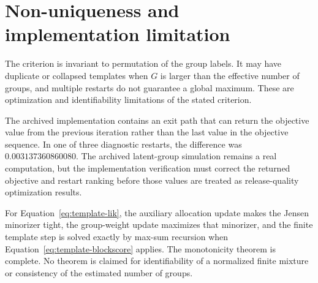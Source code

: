\begin{algorithm}[H]
\caption{Alternating optimization for finite latent-group templates}
\label{alg:multi-em}
\end{algorithm}

\section{Non-uniqueness and implementation limitation}
The criterion is invariant to permutation of the group labels. It may have duplicate or collapsed
templates when $G$ is larger than the effective number of groups, and multiple restarts do not
guarantee a global maximum. These are optimization and identifiability limitations of the stated
criterion.

The archived implementation contains an exit path that can return the objective value from the
previous iteration rather than the last value in the objective sequence. In one of three diagnostic
restarts, the difference was $0.003137360860080$. The archived latent-group simulation remains a
real computation, but the implementation verification must correct the returned objective and restart ranking
before those values are treated as release-quality optimization results.

\begin{statusbox}
For Equation~\eqref{eq:template-lik}, the auxiliary allocation update makes the Jensen minorizer
tight, the group-weight update maximizes that minorizer, and the finite template step is solved
exactly by max-sum recursion when Equation~\eqref{eq:template-blockscore} applies. The monotonicity
theorem is complete. No theorem is claimed for identifiability of a normalized finite mixture or
consistency of the estimated number of groups.
\end{statusbox}
